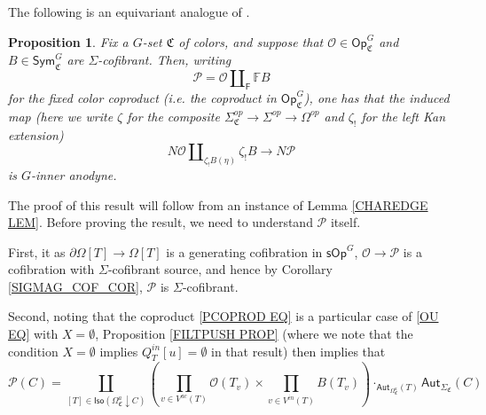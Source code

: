 \documentclass[a4paper,10pt
,draft
]{article}%
\numberwithin{equation}{section}
\numberwithin{figure}{section}
\newtheorem{proposition}[equation]{Proposition}%
\theoremstyle{definition} %
\newcommand{\Op}{\mathsf{Op}}%
\newcommand{\sOp}{\ensuremath{\mathsf{sOp}}}%
\renewcommand{\O}{\ensuremath{\mathcal O}}
\renewcommand{\P}{\ensuremath{\mathcal P}}
\newcommand{\1}{\ensuremath{\mathbbm 1}}%
\begin{document}
The following is an equivariant analogue of \cite[Prop. 3.2]{CM13b}.

\begin{proposition}\label{KEYPR PROP}
	Fix a $G$-set $\mathfrak{C}$ of colors,
	and suppose that 
	$\mathcal{O} \in \mathsf{Op}^{G}_{\mathfrak{C}}$
	and
	$B \in \mathsf{Sym}^{G}_{\mathfrak{C}}$
	are
	$\Sigma$-cofibrant.
	Then, writing
	\begin{equation}\label{PCOPROD EQ}
	\mathcal{P} = \mathcal{O} \amalg_{\mathsf{F}} \mathbb{F} B
	\end{equation}
	for the fixed color coproduct (i.e. the coproduct in $\Op^{G}_{ \mathfrak C}$),
	one has that the induced map
	(here we write $\zeta$ for the composite
	$\Sigma_{\mathfrak{C}}^{op} \to \Sigma^{op} \to \Omega^{op}$
	and $\zeta_!$ for the left Kan extension)
	\begin{equation}\label{ANODYNEMAP EQ}
	N \mathcal{O} \amalg_{\zeta_!B (\eta)} \zeta_!B \to N \mathcal{P}
	\end{equation}
	is $G$-inner anodyne.
\end{proposition}


The proof of this result will follow from an instance of 
Lemma \ref{CHAREDGE LEM}. 
Before proving the result, we need to understand $\mathcal{P}$ itself.

First, it as $\partial \Omega[T] \to \Omega[T]$ is a generating cofibration in $\sOp^G$,
$\O \to \P$ is a cofibration with $\Sigma$-cofibrant source, and hence by Corollary \ref{SIGMAG_COF_COR},
$\P$ is $\Sigma$-cofibrant.

Second, noting that the coproduct \eqref{PCOPROD EQ}
is a particular case of \eqref{OU EQ} with $X=\emptyset$,
Proposition \ref{FILTPUSH PROP}
(where we note that the condition $X=\emptyset$ implies
$Q^{in}_T[u] = \emptyset$ in that result)
then implies that  
\begin{equation}\label{PUSHOPPR EQ}
\mathcal{P}(C) = 
\coprod_{
	[T] \in \mathsf{Iso}
	\left( \Omega_{\mathfrak{C}}^a \downarrow C \right)
}
\left(
\prod_{v \in V^{ac}(T)} \mathcal{O}(T_v)
\times
\prod_{v \in V^{in}(T)} B(T_v)
\right)
\cdot_{\mathsf{Aut}_{\Omega^a_{\mathfrak{C}}}(T)} \mathsf{Aut}_{\Sigma_{\mathfrak{C}}}(C)
\end{equation}
\end{document}
